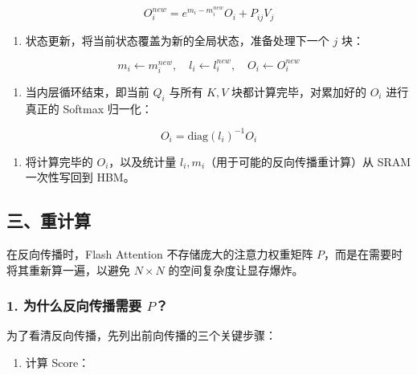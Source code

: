 \[
O_i^{new} = e^{m_i-m_i^{new}}O_i + P_{ij}V_j
\]

\begin{enumerate}
\def\labelenumi{\arabic{enumi}.}
\setcounter{enumi}{7}
\tightlist
\item
  状态更新，将当前状态覆盖为新的全局状态，准备处理下一个 \(j\) 块：
\end{enumerate}

\[
m_i \leftarrow m_i^{new},\quad l_i \leftarrow l_i^{new},\quad O_i \leftarrow O_i^{new}
\]

\begin{enumerate}
\def\labelenumi{\arabic{enumi}.}
\setcounter{enumi}{3}
\tightlist
\item
  当内层循环结束，即当前 \(Q_i\) 与所有 \(K,V\) 块都计算完毕，对累加好的 \(O_i\) 进行真正的 Softmax 归一化：
\end{enumerate}

\[
O_i = \mathrm{diag}(l_i)^{-1}O_i
\]

\begin{enumerate}
\def\labelenumi{\arabic{enumi}.}
\setcounter{enumi}{4}
\tightlist
\item
  将计算完毕的 \(O_i\)，以及统计量 \(l_i,m_i\)（用于可能的反向传播重计算）从 SRAM 一次性写回到 HBM。
\end{enumerate}

\hypertarget{ux4e09ux91cdux8ba1ux7b97}{%
\subsection{三、重计算}\label{ux4e09ux91cdux8ba1ux7b97}}

在反向传播时，Flash Attention 不存储庞大的注意力权重矩阵 \(P\)，而是在需要时将其重新算一遍，以避免 \(N \times N\) 的空间复杂度让显存爆炸。

\hypertarget{ux4e3aux4ec0ux4e48ux53cdux5411ux4f20ux64adux9700ux8981-p}{%
\subsubsection{\texorpdfstring{1. 为什么反向传播需要 \(P\)？}{1. 为什么反向传播需要 P？}}\label{ux4e3aux4ec0ux4e48ux53cdux5411ux4f20ux64adux9700ux8981-p}}

为了看清反向传播，先列出前向传播的三个关键步骤：

\begin{enumerate}
\def\labelenumi{\arabic{enumi}.}
\tightlist
\item
  计算 Score：
\end{enumerate}

